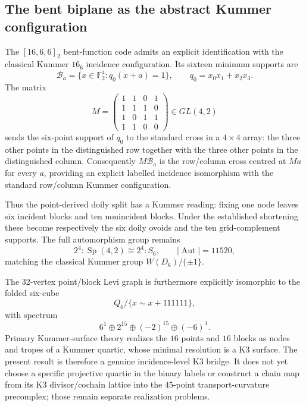 \subsection{The bent biplane as the abstract Kummer configuration}
\label{subsec:kummer-biplane-k3}

The $[16,6,6]_2$ bent-function code admits an explicit identification with the
classical Kummer $16_6$ incidence configuration.  Its sixteen minimum supports are
\[
 \mathcal B_a=\{x\in\mathbb F_2^4:q_0(x+a)=1\},\qquad
 q_0=x_0x_1+x_2x_3.
\]
The matrix
\[
 M=\begin{pmatrix}
 1&1&0&1\\
 1&1&1&0\\
 1&0&1&1\\
 1&1&0&0
 \end{pmatrix}\in GL(4,2)
\]
sends the six-point support of $q_0$ to the standard cross in a $4\times4$
array: the three other points in the distinguished row together with the three other
points in the distinguished column.  Consequently $M\mathcal B_a$ is the row/column
cross centred at $Ma$ for every $a$, providing an explicit labelled incidence
isomorphism with the standard row/column Kummer configuration.

Thus the point-derived doily split has a Kummer reading: fixing one node leaves six
incident blocks and ten nonincident blocks.  Under the established shortening these
become respectively the six doily ovoids and the ten grid-complement supports.  The
full automorphism group remains
\[
 2^4\!:\operatorname{Sp}(4,2)\cong2^4\!:\!S_6,
 \qquad |\operatorname{Aut}|=11520,
\]
matching the classical Kummer group $W(D_6)/\{\pm1\}$.

The $32$-vertex point/block Levi graph is furthermore explicitly isomorphic to the
folded six-cube
\[
 Q_6/\{x\sim x+111111\},
\]
with spectrum
\[
 \boxed{6^1\oplus2^{15}\oplus(-2)^{15}\oplus(-6)^1}.
\]
Primary Kummer-surface theory realizes the $16$ points and $16$ blocks as nodes and
tropes of a Kummer quartic, whose minimal resolution is a K3 surface.  The present
result is therefore a genuine incidence-level K3 bridge.  It does not yet choose a
specific projective quartic in the binary labels or construct a chain map from its
K3 divisor/cochain lattice into the $45$-point transport-curvature precomplex; those
remain separate realization problems.
